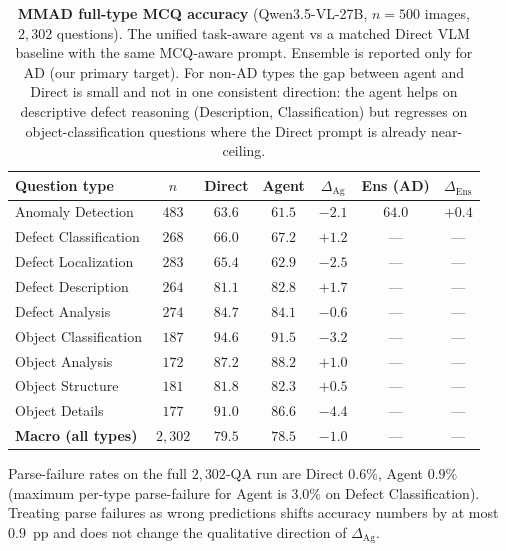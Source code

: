 \begin{table}[h]
\centering
\caption{\textbf{MMAD full-type MCQ accuracy} (Qwen3.5-VL-27B,
$n{=}500$ images, $2{,}302$ questions). The unified task-aware agent vs a matched
Direct VLM baseline with the same MCQ-aware prompt. Ensemble is
reported only for AD (our primary target). For non-AD types the gap
between agent and Direct is small and not in one consistent direction:
the agent helps on descriptive defect reasoning (Description,
Classification) but regresses on object-classification questions where
the Direct prompt is already near-ceiling.}
\label{tab:mmad_v9_fulltype}
\small
\begin{tabular}{lcccccc}
\toprule
Question type                    & $n$  & Direct & Agent & $\Delta_\text{Ag}$ & Ens (AD) & $\Delta_\text{Ens}$ \\
\midrule
Anomaly Detection                & $483$ & $63.6$ & $61.5$ & $-2.1$ & $64.0$ & $+0.4$ \\
Defect Classification            & $268$ & $66.0$ & $67.2$ & $+1.2$ & --- & --- \\
Defect Localization              & $283$ & $65.4$ & $62.9$ & $-2.5$ & --- & --- \\
Defect Description               & $264$ & $81.1$ & $82.8$ & $+1.7$ & --- & --- \\
Defect Analysis                  & $274$ & $84.7$ & $84.1$ & $-0.6$ & --- & --- \\
Object Classification            & $187$ & $94.6$ & $91.5$ & $-3.2$ & --- & --- \\
Object Analysis                  & $172$ & $87.2$ & $88.2$ & $+1.0$ & --- & --- \\
Object Structure                 & $181$ & $81.8$ & $82.3$ & $+0.5$ & --- & --- \\
Object Details                   & $177$ & $91.0$ & $86.6$ & $-4.4$ & --- & --- \\
\midrule
\textbf{Macro (all types)}       & $2{,}302$ & $79.5$ & $78.5$ & $-1.0$ & --- & --- \\
\bottomrule
\end{tabular}
\end{table}

{\footnotesize Parse-failure rates on the full $2{,}302$-QA run
are Direct $0.6\%$, Agent $0.9\%$ (maximum per-type parse-failure for
Agent is $3.0\%$ on Defect Classification). Treating parse failures
as wrong predictions shifts accuracy numbers by at most $0.9$~pp and
does not change the qualitative direction of $\Delta_\mathrm{Ag}$.}

